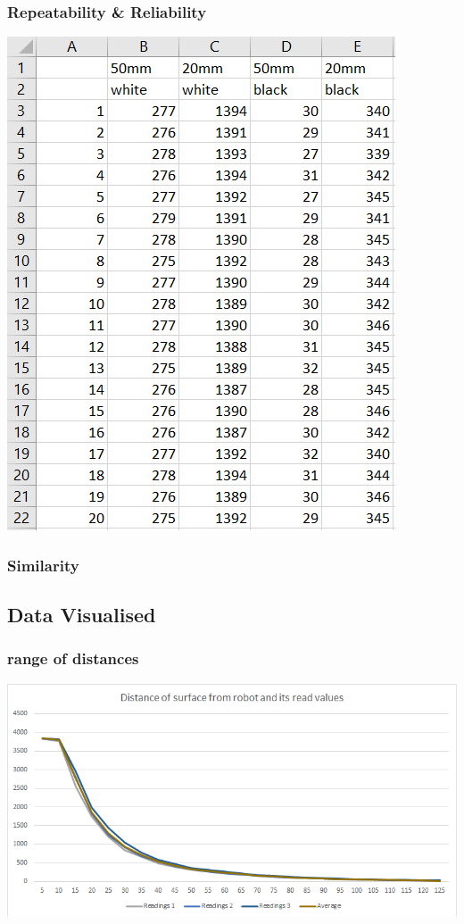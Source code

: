 \documentclass[11pt,a4paper,titlepage]{article}
\begin{document}
	\subsubsection{Repeatability \& Reliability}
		\includegraphics[width=\textwidth,height=\textheight,keepaspectratio]{irReliablity}
	\subsubsection{Similarity}
\subsection{Data Visualised}
	\subsubsection{range of distances}
		\includegraphics[width=\textwidth,height=\textheight,keepaspectratio]{irRangeLineGraph}
\end{document}
